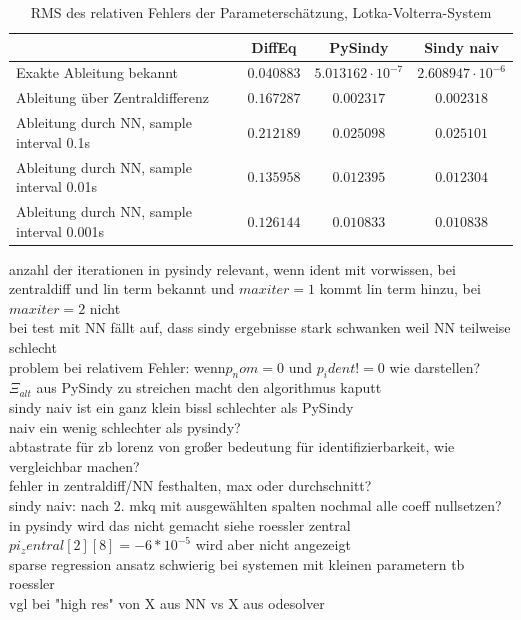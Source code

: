 \documentclass[arbeit=studie,oneside,BCOR=12mm]{ArbeitRST}
\begin{document}
\begin{table}[htbp]

\begin{tabular}[h]{l|c|c|c}
											& DiffEq		& PySindy 			& Sindy naiv		\\\hline
Exakte Ableitung bekannt					& 	$0.040883$		&	$5.013162\cdot10^{-7}$	& 	$2.608947\cdot10^{-6}$	\\\hline
Ableitung über Zentraldifferenz 			& 	$0.167287$		&	$0.002317$			&	$0.002318$			\\\hline
Ableitung durch NN, sample interval 0.1s	& 	$0.212189$		&	$0.025098$			&	$0.025101$			\\\hline
Ableitung durch NN, sample interval 0.01s	& 	$0.135958$		&	$0.012395$			&	$0.012304$			\\\hline
Ableitung durch NN, sample interval 0.001s	& 	$0.126144$		&	$0.010833$			&	$0.010838$			\\
\end{tabular}													 
\caption{RMS des relativen Fehlers der Parameterschätzung, Lotka-Volterra-System}
\end{table}


anzahl der iterationen in pysindy relevant, wenn ident mit vorwissen, bei zentraldiff und lin term bekannt und $maxiter = 1$ kommt lin term hinzu, bei $maxiter = 2$ nicht\\
bei test mit NN fällt auf, dass sindy ergebnisse stark schwanken weil NN teilweise schlecht \\
problem bei relativem Fehler: wenn$ p_nom = 0$ und $p_ident != 0$ wie darstellen?\\
$\Xi_{alt}$ aus PySindy zu streichen macht den algorithmus kaputt\\
sindy naiv ist ein ganz klein bissl schlechter als PySindy\\
naiv ein wenig schlechter als pysindy?\\
abtastrate für zb lorenz von großer bedeutung für identifizierbarkeit, wie vergleichbar machen?\\
fehler in zentraldiff/NN festhalten, max oder durchschnitt?\\
sindy naiv: nach 2. mkq mit ausgewählten spalten nochmal alle coeff nullsetzen? in pysindy wird das nicht gemacht siehe roessler zentral $pi_zentral[2][8] = -6*10^{-5}$ wird aber nicht angezeigt\\
sparse regression ansatz schwierig bei systemen mit kleinen parametern tb roessler\\
vgl bei "high res" von X aus NN vs X aus odesolver\\
\end{document}
